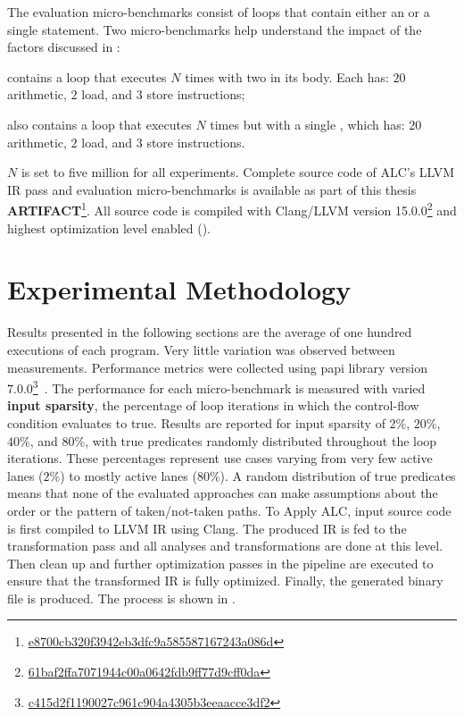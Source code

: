 The evaluation micro-benchmarks consist of loops that contain either an  or  a single  statement.
Two micro-benchmarks help understand the impact of the factors discussed in :
\begin{inparaenum}
    \item \textbf{\ifElseBench} contains a loop that executes $N$ times with two \cpaths in its body. Each \cpath has: $20$ arithmetic, $2$ load, and $3$ store instructions;
    \item \textbf{\ifThenBench} also contains a loop that executes $N$ times but with a single \cpath, which has: $20$ arithmetic, $2$ load, and $3$ store instructions.
\end{inparaenum}
$N$ is set to five million for all experiments.
Complete source code of ALC's LLVM IR pass and evaluation micro-benchmarks is available as part of this thesis \textbf{ARTIFACT}\footnote{\href{https://github.com/Rouzbeh99/Active-Lane-Consolidation.git}{e8700cb320f3942eb3dfc9a585587167243a086d}}.
All source code is compiled with Clang/LLVM version 15.0.0\footnote{\href{https://github.com/llvm/llvm-project/commit/61baf2ffa7071944c00a0642fdb9ff77d9cff0da}{61baf2ffa7071944c00a0642fdb9ff77d9cff0da}} and highest optimization level enabled ().

\section{Experimental Methodology}
\label{sec:methodology}

Results presented in the following sections are the average of one hundred executions of each program.
Very little variation was observed between measurements.
Performance metrics were collected using \acrshort{papi} library version $7.0.0$\footnote{\href{https://bitbucket.org/icl/papi/commits/c415d2f1190027c961c904a4305b3eeaacce3df2}{c415d2f1190027c961c904a4305b3eeaacce3df2}}~\cite{papi}.
The performance for each micro-benchmark is measured with varied \textbf{input sparsity}, the percentage of loop iterations in which the control-flow condition evaluates to true.
Results are reported for input sparsity of $2\%$, $20\%$, $40\%$, and $80\%$, with true predicates randomly distributed throughout the loop iterations.
These percentages represent use cases varying from very few active lanes ($2\%$) to mostly active lanes ($80\%$).
A random distribution of true predicates means that none of the evaluated approaches can make assumptions about the order or the pattern of taken/not-taken paths.
To Apply ALC, input source code is first compiled to LLVM IR using Clang. The  produced IR is fed to the transformation pass and all analyses and transformations are done at this level. Then clean up and further optimization passes in the  pipeline are executed to ensure that the transformed IR is fully optimized. 
Finally, the generated binary file is produced. The process is shown in .


